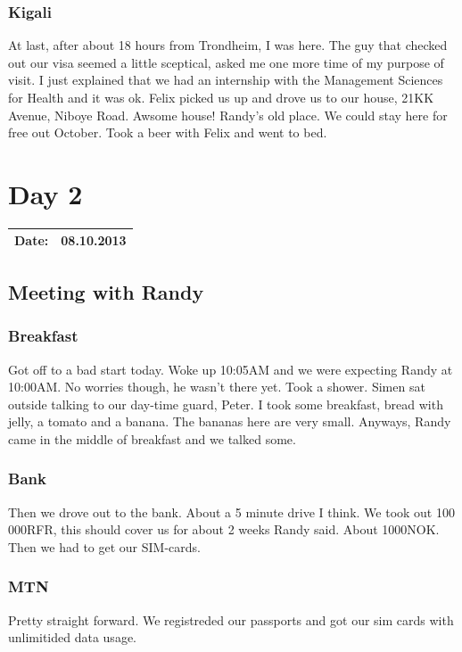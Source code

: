\subsubsection{Kigali}
At last, after about 18 hours from Trondheim, I was here. The guy that checked out our visa seemed a little sceptical, asked me one more time of my purpose of visit.
I just explained that we had an internship with the Management Sciences for Health and it was ok.
Felix picked us up and drove us to our house, 21KK Avenue, Niboye Road.
Awsome house! Randy's old place. We could stay here for free out October.
Took a beer with Felix and went to bed.
\section{Day 2}
\begin{tabular}{|c|c|}
\hline
Date: & 08.10.2013 \\
\hline
\end{tabular}
\subsection{Meeting with Randy}
\subsubsection{Breakfast}
Got off to a bad start today. Woke up 10:05AM and we were expecting Randy at 10:00AM. No worries though, he wasn't there yet.
Took a shower. Simen sat outside talking to our day-time guard, Peter.
I took some breakfast, bread with jelly, a tomato and a banana. The bananas here are very small. Anyways, Randy came in the middle of breakfast and we talked some.
\subsubsection{Bank}
Then we drove out to the bank. About a 5 minute drive I think. We took out 100 000RFR, this should cover us for about 2 weeks Randy said. About 1000NOK.
Then we had to get our SIM-cards.
\subsubsection{MTN}
Pretty straight forward. We registreded our passports and got our sim cards with unlimitided data usage.
